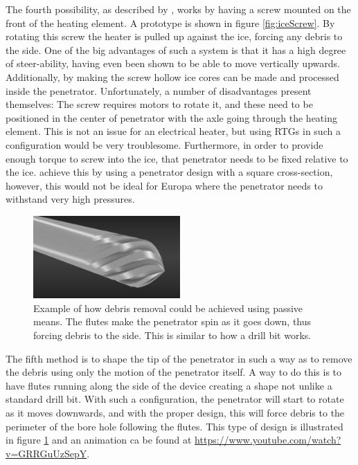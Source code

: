 \noindent
The fourth possibility, as described by \citet{article:dachwald2014a}, works by having a screw mounted on the front of the heating element. A prototype is shown in figure \ref{fig:iceScrew}. By rotating this screw the heater is pulled up against the ice, forcing any debris to the side. One of the big advantages of such a system is that it has a high degree of steer-ability, having even been shown to be able to move vertically upwards\cite{article:dachwald2014a}.  
Additionally, by making the screw hollow ice cores can be made and processed inside the penetrator. Unfortunately, a number of disadvantages present themselves: The screw requires motors to rotate it, and these need to be positioned in the center of penetrator with the axle going through the heating element. This is not an issue for an electrical heater, but using RTGs in such a configuration would be very troublesome. Furthermore, in order to provide enough torque to screw into the ice, that penetrator needs to be fixed relative to the ice. \citet{article:dachwald2014a} achieve this by using a penetrator design with a square cross-section, however, this would not be ideal for Europa where the penetrator needs to withstand very high pressures.\\

 \begin{figure}[ht]
 	\centering
 	\includegraphics[width=0.5\textwidth]{figures/LAMC/flutedHead}
 	\caption{Example of how debris removal could be achieved using passive means. The flutes make the penetrator spin as it goes down, thus forcing debris to the side. This is similar to how a drill bit works.}
 	\label{fig:flutedHead}
 \end{figure}  

\noindent
The fifth method is to shape the tip of the penetrator in such a way as to remove the debris using only the motion of the penetrator itself. A way to do this is to have flutes running along the side of the device creating a shape not unlike a standard drill bit. With such a configuration, the penetrator will start to rotate as it moves downwards, and with the proper design, this will force debris to the perimeter of the bore hole following the flutes. This type of design is illustrated in figure \ref{fig:flutedHead} and an animation ca be found at \url{https://www.youtube.com/watch?v=GRRGuUzSepY}.  \\

